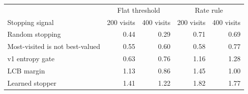 \begin{tabular}{lrrrr}
\toprule
 & \multicolumn{2}{c}{Flat threshold} & \multicolumn{2}{c}{Rate rule} \\
Stopping signal & 200 visits & 400 visits & 200 visits & 400 visits \\
\midrule
Random stopping & 0.44 & 0.29 & 0.71 & 0.69 \\
Most-visited is not best-valued & 0.55 & 0.60 & 0.58 & 0.77 \\
v1 entropy gate & 0.63 & 0.76 & 1.16 & 1.28 \\
LCB margin & 1.13 & 0.86 & 1.45 & 1.00 \\
\midrule
Learned stopper & 1.41 & 1.22 & 1.82 & 1.77 \\
\bottomrule
\end{tabular}

